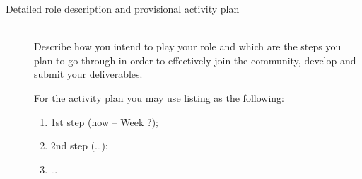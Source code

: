 \documentclass[runningheads]{llncs}
\begin{document}
\begin{description}
  \item[Detailed role description and provisional activity plan]\mbox{}\\
     Describe how you intend to play your role and which are the steps you plan to go through in order to effectively
     join the community, develop and submit your deliverables.
     
     For the activity plan you may use listing as the following:
     \begin{enumerate}
       \item 1st step (now -- Week ?);
       \item 2nd step (\dots);
       \item \dots
     \end{enumerate}
\end{description}
\end{document}
